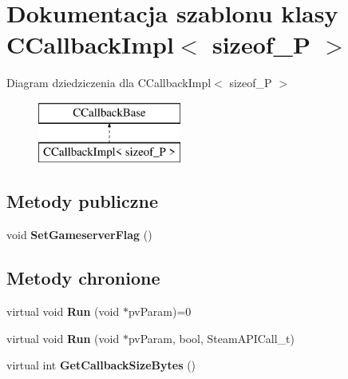 \hypertarget{class_c_callback_impl}{}\section{Dokumentacja szablonu klasy C\+Callback\+Impl$<$ sizeof\+\_\+P $>$}
\label{class_c_callback_impl}
Diagram dziedziczenia dla C\+Callback\+Impl$<$ sizeof\+\_\+P $>$\begin{figure}[H]
\begin{center}
\leavevmode
\includegraphics[height=2.000000cm]{class_c_callback_impl}
\end{center}
\end{figure}
\subsection*{Metody publiczne}
\begin{DoxyCompactItemize}
\item 
\mbox{\label{class_c_callback_impl_accb69c915ddae9b5fa3ba85412f0705c}} 
void {\bfseries Set\+Gameserver\+Flag} ()
\end{DoxyCompactItemize}
\subsection*{Metody chronione}
\begin{DoxyCompactItemize}
\item 
\mbox{\label{class_c_callback_impl_ab43d239a5cbc08ff52a4fec7b8d2a043}} 
virtual void {\bfseries Run} (void $\ast$pv\+Param)=0
\item 
\mbox{\label{class_c_callback_impl_a3b69d89e971ea130920f6482d820ba45}} 
virtual void {\bfseries Run} (void $\ast$pv\+Param, bool, Steam\+A\+P\+I\+Call\+\_\+t)
\item 
\mbox{\label{class_c_callback_impl_a676ab6269d352f2c85aed4a5e5382f75}} 
virtual int {\bfseries Get\+Callback\+Size\+Bytes} ()
\end{DoxyCompactItemize}
